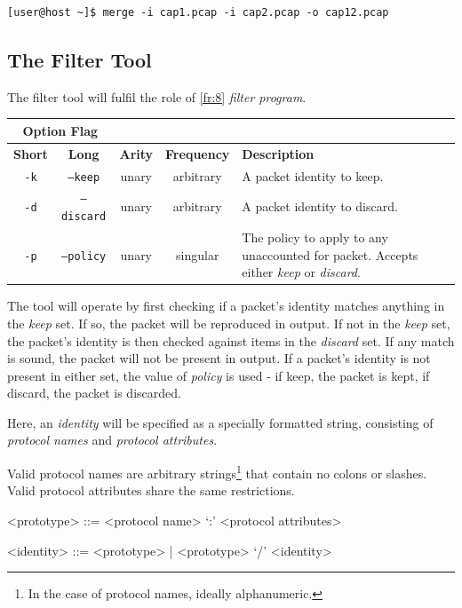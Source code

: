\documentclass[10pt,a4paper,notitlepage]{report}
\begin{document}
\begin{verbatim}
[user@host ~]$ merge -i cap1.pcap -i cap2.pcap -o cap12.pcap
\end{verbatim}

\subsection{The Filter Tool}
\label{sec:filterdes}
The filter tool will fulfil the role of \ref{fr:8} \emph{filter program}.

\begin{tabularx}{\textwidth}{|c|c|c|c|X|}
\cline{1-2}
\multicolumn{2}{|c|}{\textbf{Option Flag}} & \multicolumn{3}{c}{}\\ \hline
\textbf{Short} & \textbf{Long} & \textbf{Arity} & \textbf{Frequency} & \textbf{Description} \\ \hline
\texttt{-k} & \texttt{--keep} & unary & arbitrary & A packet identity to keep.\\ \hline
\texttt{-d} & \texttt{--discard} & unary & arbitrary & A packet identity to discard.\\ \hline
\texttt{-p} & \texttt{--policy} & unary & singular & The policy to apply to any unaccounted for packet. Accepts either \emph{keep} or \emph{discard}.\\ \hline
\end{tabularx}

The tool will operate by first checking if a packet's identity matches anything in the \emph{keep} set. If so, the packet will be reproduced in output. If not in the \emph{keep} set, the packet's identity is then checked against items in the \emph{discard} set. If any match is sound, the packet will not be present in output. If a packet's identity is not present in either set, the value of \emph{policy} is used - if keep, the packet is kept, if discard, the packet is discarded.

Here, an \emph{identity} will be specified as a specially formatted string, consisting of \emph{protocol names} and \emph{protocol attributes}.

Valid protocol names are arbitrary strings\footnote{In the case of protocol names, ideally alphanumeric.} that contain no colons or slashes. Valid protocol attributes share the same restrictions.

\begin{grammar}
<prototype> ::= <protocol name> `:' <protocol attributes>

<identity> ::= <prototype> | <prototype> `/' <identity>
\end{grammar}
\end{document}
